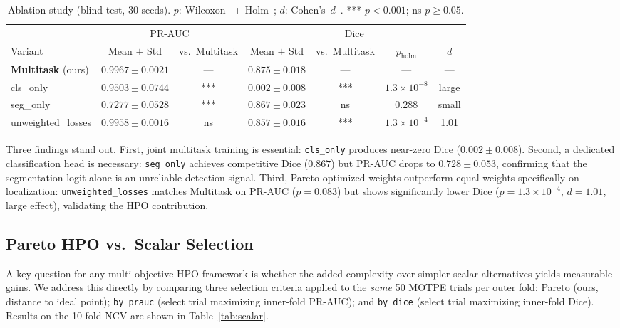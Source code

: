 \begin{table}[!t]
  \centering
  \caption{Ablation study (blind test, 30 seeds).
           $p$: Wilcoxon~\citep{wilcoxon1945} + Holm~\citep{holm1979};
           $d$: Cohen's~$d$~\citep{cohen1988statistical}.
           *** $p < 0.001$; ns $p \geq 0.05$.}
  \label{tab:ablation}
  \begin{tabular}{lcccccc}
    \toprule
    & \multicolumn{2}{c}{PR-AUC} & \multicolumn{4}{c}{Dice} \\
    \cmidrule(r){2-3} \cmidrule(l){4-7}
    Variant & Mean $\pm$ Std & vs.\ Multitask & Mean $\pm$ Std & vs.\ Multitask & $p_{\text{holm}}$ & $d$ \\
    \midrule
    \textbf{Multitask} (ours) & $\mathbf{0.9967 \pm 0.0021}$ & — & $\mathbf{0.875 \pm 0.018}$ & — & — & — \\
    cls\_only          & $0.9503 \pm 0.0744$ & *** & $0.002 \pm 0.008$ & *** & $1.3 \times 10^{-8}$ & large \\
    seg\_only          & $0.7277 \pm 0.0528$ & *** & $0.867 \pm 0.023$ & ns  & $0.288$              & small \\
    unweighted\_losses & $0.9958 \pm 0.0016$ & ns  & $0.857 \pm 0.016$ & *** & $1.3 \times 10^{-4}$ & 1.01 \\
    \bottomrule
  \end{tabular}
\end{table}

Three findings stand out. First, joint multitask training is essential:
\texttt{cls\_only} produces near-zero Dice ($0.002 \pm 0.008$). Second, a
dedicated classification head is necessary: \texttt{seg\_only} achieves
competitive Dice ($0.867$) but PR-AUC drops to $0.728 \pm 0.053$, confirming
that the segmentation logit alone is an unreliable detection signal. Third,
Pareto-optimized weights outperform equal weights specifically on localization:
\texttt{unweighted\_losses} matches Multitask on PR-AUC ($p = 0.083$) but
shows significantly lower Dice ($p = 1.3 \times 10^{-4}$, $d = 1.01$, large
effect), validating the HPO contribution.

\subsection{Pareto HPO vs.\ Scalar Selection}
\label{subsec:scalar}

A key question for any multi-objective HPO framework is whether the added
complexity over simpler scalar alternatives yields measurable gains. We
address this directly by comparing three selection criteria applied to the
\emph{same} 50 MOTPE trials per outer fold: Pareto (ours, distance
to ideal point); \texttt{by\_prauc} (select trial maximizing inner-fold
PR-AUC); and \texttt{by\_dice} (select trial maximizing inner-fold Dice).
Results on the 10-fold NCV are shown in Table~\ref{tab:scalar}.

